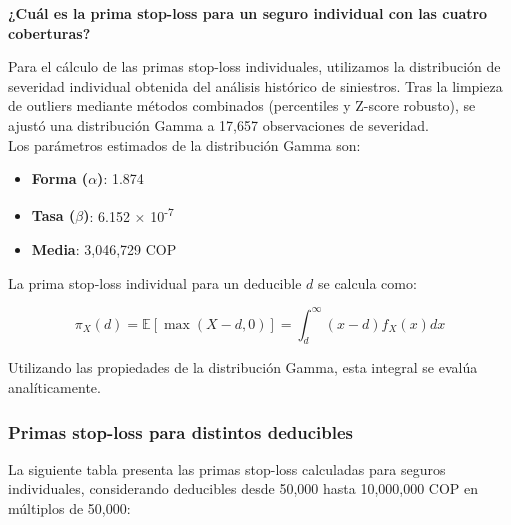 \textbf{¿Cuál es la prima stop-loss para un seguro individual con las cuatro coberturas?}

Para el cálculo de las primas stop-loss individuales, utilizamos la distribución de severidad individual obtenida del análisis histórico de siniestros. Tras la limpieza de outliers mediante métodos combinados (percentiles y Z-score robusto), se ajustó una distribución Gamma a 17,657 observaciones de severidad.\\

Los parámetros estimados de la distribución Gamma son:
\begin{itemize}
\item \textbf{Forma ($\alpha$)}: 1.874
\item \textbf{Tasa ($\beta$)}: 6.152 × 10\textsuperscript{-7}
\item \textbf{Media}: 3,046,729 COP
\end{itemize}

La prima stop-loss individual para un deducible $d$ se calcula como:

$$\pi_X(d) = \mathbb{E}[\max(X - d, 0)] = \int_d^{\infty} (x - d) f_X(x) dx$$

Utilizando las propiedades de la distribución Gamma, esta integral se evalúa analíticamente.

\subsubsection{Primas stop-loss para distintos deducibles}

La siguiente tabla presenta las primas stop-loss calculadas para seguros individuales, considerando deducibles desde 50,000 hasta 10,000,000 COP en múltiplos de 50,000:

